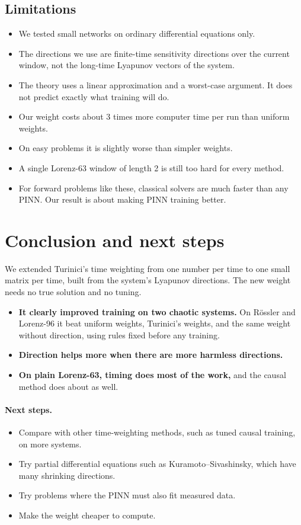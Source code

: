 \documentclass[11pt,a4paper]{article}
\begin{document}
\subsection{Limitations}
\begin{itemize}
\item We tested small networks on ordinary differential equations only.
\item The directions we use are finite-time sensitivity directions over the current window,
  not the long-time Lyapunov vectors of the system.
\item The theory uses a linear approximation and a worst-case argument. It does not predict
  exactly what training will do.
\item Our weight costs about 3 times more computer time per run than uniform weights.
\item On easy problems it is slightly worse than simpler weights.
\item A single Lorenz-63 window of length 2 is still too hard for every method.
\item For forward problems like these, classical solvers are much faster than any PINN. Our
  result is about making PINN training better.
\end{itemize}

\section{Conclusion and next steps}
We extended Turinici's time weighting from one number per time to one small matrix per time,
built from the system's Lyapunov directions. The new weight needs no true solution and no
tuning.
\begin{itemize}
\item \textbf{It clearly improved training on two chaotic systems.} On Rössler and Lorenz-96
  it beat uniform weights, Turinici's weights, and the same weight without direction, using
  rules fixed before any training.
\item \textbf{Direction helps more when there are more harmless directions.}
\item \textbf{On plain Lorenz-63, timing does most of the work,} and the causal method does
  about as well.
\end{itemize}

\paragraph{Next steps.}
\begin{itemize}
\item Compare with other time-weighting methods, such as tuned causal training, on more
  systems.
\item Try partial differential equations such as Kuramoto--Sivashinsky, which have many
  shrinking directions.
\item Try problems where the PINN must also fit measured data.
\item Make the weight cheaper to compute.
\end{itemize}
\end{document}

